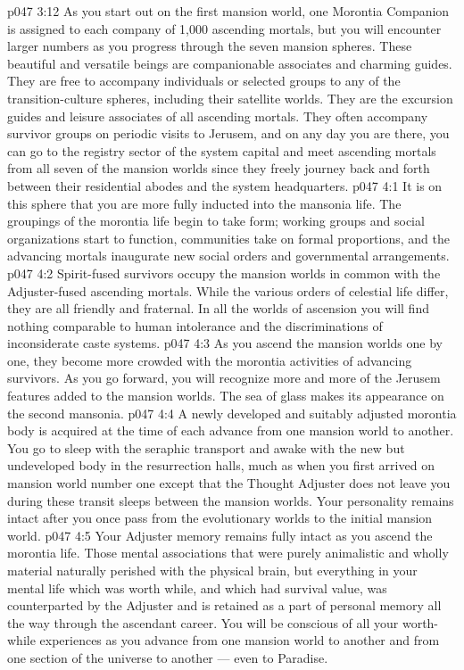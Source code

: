 \vs p047 3:12 As you start out on the first mansion world, one Morontia Companion is assigned to each company of 1,000 ascending mortals, but you will encounter larger numbers as you progress through the seven mansion spheres. These beautiful and versatile beings are companionable associates and charming guides. They are free to accompany individuals or selected groups to any of the transition\hyp{}culture spheres, including their satellite worlds. They are the excursion guides and leisure associates of all ascending mortals. They often accompany survivor groups on periodic visits to Jerusem, and on any day you are there, you can go to the registry sector of the system capital and meet ascending mortals from all seven of the mansion worlds since they freely journey back and forth between their residential abodes and the system headquarters.
\vs p047 4:1 It is on this sphere that you are more fully inducted into the mansonia life. The groupings of the morontia life begin to take form; working groups and social organizations start to function, communities take on formal proportions, and the advancing mortals inaugurate new social orders and governmental arrangements.
\vs p047 4:2 Spirit\hyp{}fused survivors occupy the mansion worlds in common with the Adjuster\hyp{}fused ascending mortals. While the various orders of celestial life differ, they are all friendly and fraternal. In all the worlds of ascension you will find nothing comparable to human intolerance and the discriminations of inconsiderate caste systems.
\vs p047 4:3 As you ascend the mansion worlds one by one, they become more crowded with the morontia activities of advancing survivors. As you go forward, you will recognize more and more of the Jerusem features added to the mansion worlds. The sea of glass makes its appearance on the second mansonia.
\vs p047 4:4 A newly developed and suitably adjusted morontia body is acquired at the time of each advance from one mansion world to another. You go to sleep with the seraphic transport and awake with the new but undeveloped body in the resurrection halls, much as when you first arrived on mansion world number one except that the Thought Adjuster does not leave you during these transit sleeps between the mansion worlds. Your personality remains intact after you once pass from the evolutionary worlds to the initial mansion world.
\vs p047 4:5 Your Adjuster memory remains fully intact as you ascend the morontia life. Those mental associations that were purely animalistic and wholly material naturally perished with the physical brain, but everything in your mental life which was worth while, and which had survival value, was counterparted by the Adjuster and is retained as a part of personal memory all the way through the ascendant career. You will be conscious of all your worth\hyp{}while experiences as you advance from one mansion world to another and from one section of the universe to another --- even to Paradise.
